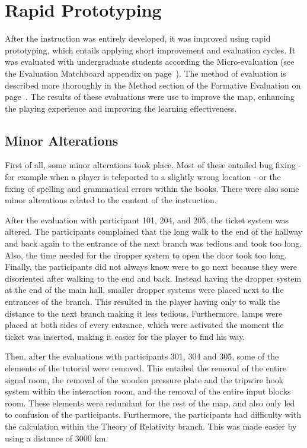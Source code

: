 \documentclass[11pt,twoside]{report} %
\begin{document}
\section{Rapid Prototyping}

After the instruction was entirely developed, it was improved using rapid prototyping, which entails applying short improvement and evaluation cycles. It was evaluated with undergraduate students according the Micro-evaluation (see the Evaluation Matchboard appendix on page~\pageref{app:evamatchboard}). The method of evaluation is described more thoroughly in the Method section of the Formative Evaluation on page~\pageref{sec:methodevaluation}. The results of these evaluations were use to improve the map, enhancing the playing experience and improving the learning effectiveness. 

\subsection{Minor Alterations}

First of all, some minor alterations took place. Most of these entailed bug fixing - for example when a player is teleported to a slightly wrong location - or the fixing of spelling and grammatical errors within the books. There were also some minor alterations related to the content of the instruction.

After the evaluation with participant 101, 204, and 205, the ticket system was altered. The participants complained that the long walk to the end of the hallway and back again to the entrance of the next branch was tedious and took too long. Also, the time needed for the dropper system to open the door took too long. Finally, the participants did not always know were to go next because they were disoriented after walking to the end and back. Instead having the dropper system at the end of the main hall, smaller dropper systems were placed next to the entrances of the branch. This resulted in the player having only to walk the distance to the next branch making it less tedious. Furthermore, lamps were placed at both sides of every entrance, which were activated the moment the ticket was inserted, making it easier for the player to find his way.

Then, after the evaluations with participants 301, 304 and 305, some of the elements of the tutorial were removed. This entailed the removal of the entire signal room, the removal of the wooden pressure plate and the tripwire hook system within the interaction room, and the removal of the entire input blocks room. These elements were redundant for the rest of the map, and also only led to confusion of the participants. Furthermore, the participants had difficulty with the calculation within the Theory of Relativity branch. This was made easier by using a distance of 3000 km.
\end{document}
